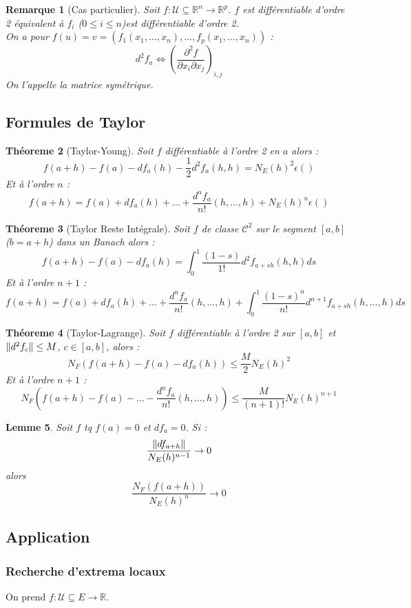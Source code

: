 \documentclass[a4paper, oneside]{report}
\theoremstyle{break}
\newtheorem{thm}{Théoreme}[section] %
\newtheorem{lemme}[thm]{Lemme}
\newtheorem{remar}[thm]{Remarque}
\newcommand{\R}{\mathbb{R}}
\newcommand{\U}{\mathcal{U}}
\newcommand{\fracun}[1]{\frac{1}{#1}}
\DeclarePairedDelimiter\norm{\lVert}{\rVert}%
\begin{document}
\begin{remar}[Cas particulier]
Soit $f : \U \subseteq \R^n\rightarrow \R^p$. $f$ est différentiable d'ordre 2 équivalent à $f_i$ ($0\leq i \leq n$)est différentiable d'ordre 2.\\
On a pour $f(u)=v=(f_1(x_1,\ldots, x_n), \ldots,f_p(x_1,\ldots, x_n))$ :
$$d^2 f_a \Leftrightarrow (\frac{\partial^2f}{\partial x_i \partial x_j})_{i,j}$$
On l'appelle la matrice symétrique.
\end{remar}

\subsection{Formules de Taylor}

\begin{thm}[Taylor-Young]
Soit $f$ différentiable à l'ordre 2 en $a$ alors :
$$f(a+h)-f(a)-df_a(h)-\fracun{2}d^2f_a(h,h)=N_E(h)^2\epsilon()$$
Et à l'ordre $n$ :
$$f(a+h)= f(a)+df_a(h)+\ldots + \frac{d^nf_a}{n!}(h,\ldots, h)+N_E(h)^n\epsilon()$$
\end{thm}

\begin{thm}[Taylor Reste Intégrale]
Soit $f$ de classe $\mathcal{C}^2$ sur le segment $[a,b]$ ($b=a+h$) dans un Banach alors :
$$f(a+h)-f(a)-df_a(h)=\int_0^1\frac{(1-s)}{1!}d^2f_{a+sh}(h,h)ds$$
Et à l'ordre $n+1$ :
$$f(a+h)= f(a)+df_a(h)+\ldots + \frac{d^nf_a}{n!}(h,\ldots, h)+\int_0^1\frac{(1-s)^n}{n!}d^{n+1}f_{a+sh}(h,\ldots, h)ds$$
\end{thm}

\begin{thm}[Taylor-Lagrange]
Soit $f$ différentiable à l'ordre 2 sur $[a,b]$ et $\norm{d^2f_c}\leq M$, $c\in [a,b]$, alors :
$$N_F(f(a+h)-f(a)-df_a(h)) \leq \frac{M}{2} N_E(h)^2$$
Et à l'ordre $n +1$ :
$$N_F(f(a+h)-f(a)-\ldots-\frac{d^nf_a}{n!}(h,\ldots, h)) \leq \frac{M}{(n+1)!} N_E(h)^{n+1}$$
\end{thm}

\begin{lemme}
Soit $f$ tq $f(a)=0$ et $df_a = 0$. Si :
$$\frac{\norm{df_{a+h}}}{N_E(h)^{n-1}}\rightarrow 0$$
alors 
$$\frac{N_F(f(a+h))}{N_E(h)^n}\rightarrow 0$$
\end{lemme}

\subsection{Application}

\subsubsection{Recherche d'extrema locaux}
On prend $f : \U \subseteq E \rightarrow \R$.
\end{document}
